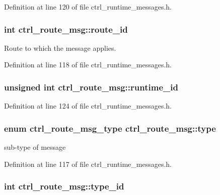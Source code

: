 Definition at line 120 of file ctrl\-\_\-runtime\-\_\-messages.\-h.

\hypertarget{structctrl__route__msg_ace2981a09919332eb535700c18e4ab19}{
\subsubsection[{route\-\_\-id}]{\setlength{\rightskip}{0pt plus 5cm}int ctrl\-\_\-route\-\_\-msg\-::route\-\_\-id}}\label{structctrl__route__msg_ace2981a09919332eb535700c18e4ab19}


Route to which the message applies. 



Definition at line 118 of file ctrl\-\_\-runtime\-\_\-messages.\-h.

\hypertarget{structctrl__route__msg_a87e6c3090932650f56352dd97b5089b3}{
\subsubsection[{runtime\-\_\-id}]{\setlength{\rightskip}{0pt plus 5cm}unsigned int ctrl\-\_\-route\-\_\-msg\-::runtime\-\_\-id}}\label{structctrl__route__msg_a87e6c3090932650f56352dd97b5089b3}


Definition at line 124 of file ctrl\-\_\-runtime\-\_\-messages.\-h.

\hypertarget{structctrl__route__msg_aa809d7c9ee772df20d285e8da7d71849}{
\subsubsection[{type}]{\setlength{\rightskip}{0pt plus 5cm}enum {\bf ctrl\-\_\-route\-\_\-msg\-\_\-type} ctrl\-\_\-route\-\_\-msg\-::type}}\label{structctrl__route__msg_aa809d7c9ee772df20d285e8da7d71849}


sub-\/type of message 



Definition at line 117 of file ctrl\-\_\-runtime\-\_\-messages.\-h.

\hypertarget{structctrl__route__msg_a3b818d3acb7a45f6e32a70d0ebfe0449}{
\subsubsection[{type\-\_\-id}]{\setlength{\rightskip}{0pt plus 5cm}int ctrl\-\_\-route\-\_\-msg\-::type\-\_\-id}}\label{structctrl__route__msg_a3b818d3acb7a45f6e32a70d0ebfe0449}



